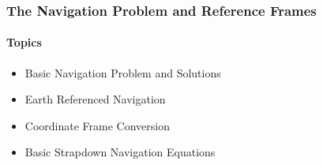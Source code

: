 \begin{frame}
\frametitle{\textbf{The Navigation Problem and Reference Frames}}
\framesubtitle{Topics}
 \begin{itemize}
 \item Basic Navigation Problem and Solutions
 \item Earth Referenced Navigation
 \item Coordinate Frame Conversion
 \item Basic Strapdown Navigation Equations
\end{itemize}
\end{frame}





